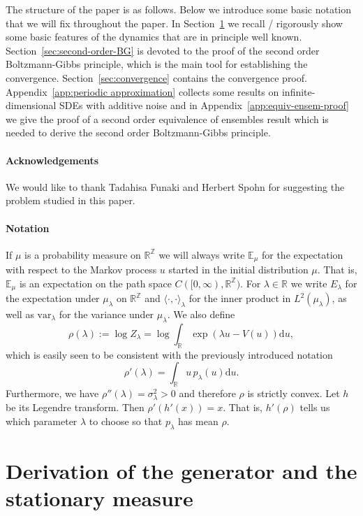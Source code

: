 \documentclass[11pt, a4paper]{article}
\newcommand{\cdummy}{\cdot}
\newcommand{\mathd}{\mathrm{d}}
\newcommand{\dd}{\mathrm{d}}
\newcommand{\R}{\mathbb{R}}
\newcommand{\E}{\mathbb{E}}
\newcommand{\1}{\mathbf{1}}
\newcommand{\Z}{\mathbb{Z}}
\begin{document}
The structure of the paper is as follows. Below we introduce some basic notation that we will fix throughout the paper. In Section~\ref{sec:generatorAndStationaryMeasure} we recall / rigorously show some basic features of the dynamics that are in principle well known. Section~\ref{sec:second-order-BG} is devoted to the proof of the second order Boltzmann-Gibbs principle, which is the main tool for establishing the convergence.  Section~\ref{sec:convergence} contains the convergence proof. Appendix~\ref{app:periodic approximation} collects some results on infinite-dimensional SDEs with additive noise and in Appendix~\ref{app:equiv-ensem-proof} we give the proof of a second order equivalence of ensembles result which is needed to derive the second order Boltzmann-Gibbs principle.

\paragraph{Acknowledgements} We would like to thank Tadahisa Funaki and Herbert Spohn for suggesting the problem studied in this paper.


\paragraph{Notation} If $\mu$ is a probability measure on $\R^\Z$ we will always write $\E_\mu$ for the expectation with respect to the Markov process $u$ started in the initial distribution $\mu$. That is, $\E_\mu$ is an expectation on the path space $C([0,\infty), \R^\Z)$. For $\lambda \in \R$ we write $E_\lambda$ for the expectation under $\mu_\lambda$ on $\R^\Z$ and $\langle \cdummy, \cdummy \rangle_{\lambda}$ for
the inner product in $L^2 ({\mu}_{\lambda})$, as well as $\mathrm{var}_\lambda$ for the variance under $\mu_\lambda$. We also define
\[
   \rho(\lambda):= \log Z_\lambda = \log \int_\R \exp (\lambda u - V(u)) \dd u,
\]
which is easily seen to be consistent with the previously introduced notation
\[
   \rho'(\lambda) = \int_\R u \, p_\lambda(u)  \mathd u.
\]
Furthermore, we have $\rho''(\lambda) = \sigma^2_\lambda > 0$ and therefore $\rho$ is
strictly convex. Let $h$ be its Legendre transform.
Then $\rho'( h'(x) ) = x$. That is, $h'(\rho)$ tells us which parameter $\lambda$ to choose so that $p_\lambda$ has mean $\rho$. 


\section{Derivation of the generator and the stationary measure}\label{sec:generatorAndStationaryMeasure}
\end{document}
